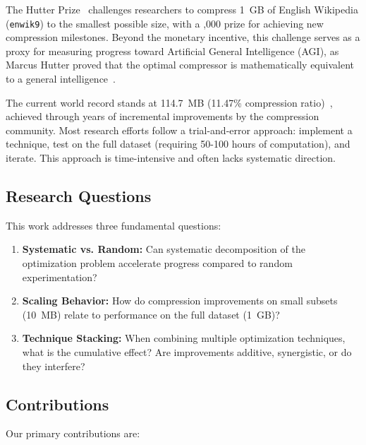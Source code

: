 \documentclass[conference]{IEEEtran}
\newcommand{\enwik}{{\tt enwik9}}
\begin{document}
The Hutter Prize~\cite{hutter2006prize} challenges researchers to compress 1~GB of English Wikipedia (\enwik) to the smallest possible size, with a ,000 prize for achieving new compression milestones. Beyond the monetary incentive, this challenge serves as a proxy for measuring progress toward Artificial General Intelligence (AGI), as Marcus Hutter proved that the optimal compressor is mathematically equivalent to a general intelligence~\cite{hutter2005universal}.

The current world record stands at 114.7~MB (11.47\% compression ratio)~\cite{margaritov2021starlit}, achieved through years of incremental improvements by the compression community. Most research efforts follow a trial-and-error approach: implement a technique, test on the full dataset (requiring 50-100 hours of computation), and iterate. This approach is time-intensive and often lacks systematic direction.

\subsection{Research Questions}

This work addresses three fundamental questions:

\begin{enumerate}
    \item \textbf{Systematic vs. Random:} Can systematic decomposition of the optimization problem accelerate progress compared to random experimentation?
    
    \item \textbf{Scaling Behavior:} How do compression improvements on small subsets (10~MB) relate to performance on the full dataset (1~GB)?
    
    \item \textbf{Technique Stacking:} When combining multiple optimization techniques, what is the cumulative effect? Are improvements additive, synergistic, or do they interfere?
\end{enumerate}

\subsection{Contributions}

Our primary contributions are:
\end{document}
